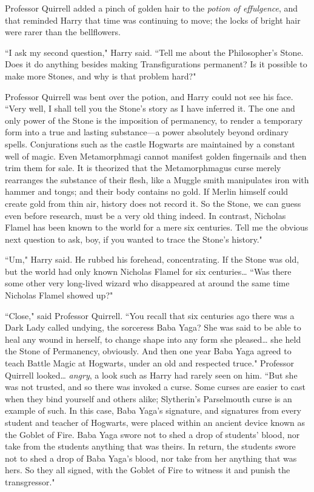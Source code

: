 Professor Quirrell added a pinch of golden hair to the \emph{potion of effulgence}, and that reminded Harry that time was continuing to move; the locks of bright hair were rarer than the bellflowers.

``I ask my second question," Harry said. ``Tell me about the Philosopher's Stone. Does it do anything besides making Transfigurations permanent? Is it possible to make more Stones, and why is that problem hard?"

Professor Quirrell was bent over the potion, and Harry could not see his face. ``Very well, I shall tell you the Stone's story as I have inferred it. The one and only power of the Stone is the imposition of permanency, to render a temporary form into a true and lasting substance—a power absolutely beyond ordinary spells. Conjurations such as the castle Hogwarts are maintained by a constant well of magic. Even Metamorphmagi cannot manifest golden fingernails and then trim them for sale. It is theorized that the Metamorphmagus curse merely rearranges the substance of their flesh, like a Muggle smith manipulates iron with hammer and tongs; and their body contains no gold. If Merlin himself could create gold from thin air, history does not record it. So the Stone, we can guess even before research, must be a very old thing indeed. In contrast, Nicholas Flamel has been known to the world for a mere six centuries. Tell me the obvious next question to ask, boy, if you wanted to trace the Stone's history."

``Um," Harry said. He rubbed his forehead, concentrating. If the Stone was old, but the world had only known Nicholas Flamel for six centuries{\ldots} ``Was there some other very long-lived wizard who disappeared at around the same time Nicholas Flamel showed up?"

``Close," said Professor Quirrell. ``You recall that six centuries ago there was a Dark Lady called undying, the sorceress Baba Yaga? She was said to be able to heal any wound in herself, to change shape into any form she pleased{\ldots} she held the Stone of Permanency, obviously. And then one year Baba Yaga agreed to teach Battle Magic at Hogwarts, under an old and respected truce." Professor Quirrell looked{\ldots} \emph{angry}, a look such as Harry had rarely seen on him. ``But she was not trusted, and so there was invoked a curse. Some curses are easier to cast when they bind yourself and others alike; Slytherin's Parselmouth curse is an example of such. In this case, Baba Yaga's signature, and signatures from every student and teacher of Hogwarts, were placed within an ancient device known as the Goblet of Fire. Baba Yaga swore not to shed a drop of students' blood, nor take from the students anything that was theirs. In return, the students swore not to shed a drop of Baba Yaga's blood, nor take from her anything that was hers. So they all signed, with the Goblet of Fire to witness it and punish the transgressor."

